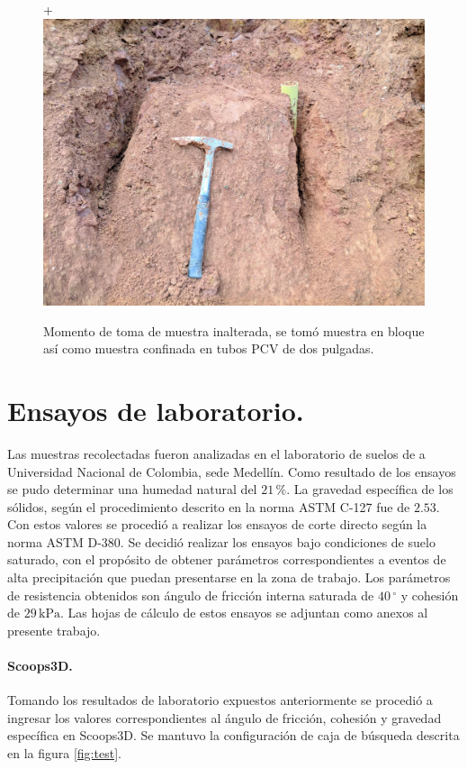 \begin{figure}[H]+
\centering
\includegraphics[scale=0.20]{img/estacion11.jpg}
\caption{Momento de toma de muestra inalterada, se tom\'o muestra en bloque as\'i como muestra confinada en tubos PCV de dos pulgadas.}
\label{fig:toma-bloque}
\end{figure}

\section{Ensayos de laboratorio.}

Las muestras recolectadas fueron analizadas en el laboratorio de suelos de a Universidad Nacional de Colombia, sede Medellín.
Como resultado de los ensayos se pudo determinar una humedad natural del \(21\,\%\).
La gravedad específica de los s\'olidos, seg\'un el procedimiento descrito en la norma ASTM C-127 fue de \(2.53\).
Con estos valores se procedi\'o a realizar los ensayos de corte directo seg\'un la norma ASTM D-380. Se decidi\'o realizar los ensayos bajo condiciones de suelo saturado, con el propósito de obtener par\'ametros correspondientes a eventos de alta precipitaci\'on que puedan presentarse en la zona de trabajo.
Los par\'ametros de resistencia obtenidos son ángulo de fricción interna saturada de \(40\,^\circ\) y cohesi\'on de \(29\,\text{kPa}\). Las hojas de c\'alculo de estos ensayos se adjuntan como anexos al presente trabajo.

\paragraph{Scoops3D.}
Tomando los resultados de laboratorio expuestos anteriormente se procedió a ingresar los valores correspondientes al \'angulo de fricción, cohesi\'on y gravedad espec\'ifica en Scoops3D. Se mantuvo la configuración de caja de b\'usqueda descrita en la figura \ref{fig:test}.

